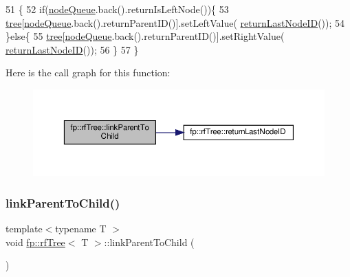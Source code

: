 \begin{DoxyCode}
51                                                \{
52                     \textcolor{keywordflow}{if}(\hyperlink{classfp_1_1rfTree_af72d0a2f930fd480dfb4858885c2df23}{nodeQueue}.back().returnIsLeftNode())\{
53                         \hyperlink{classtree}{tree}[\hyperlink{classfp_1_1rfTree_af72d0a2f930fd480dfb4858885c2df23}{nodeQueue}.back().returnParentID()].setLeftValue(
      \hyperlink{classfp_1_1rfTree_a1b8c04f3f3ce362d9627c2ca66d10efd}{returnLastNodeID}());
54                     \}\textcolor{keywordflow}{else}\{
55                         \hyperlink{classtree}{tree}[\hyperlink{classfp_1_1rfTree_af72d0a2f930fd480dfb4858885c2df23}{nodeQueue}.back().returnParentID()].setRightValue(
      \hyperlink{classfp_1_1rfTree_a1b8c04f3f3ce362d9627c2ca66d10efd}{returnLastNodeID}());
56                     \}
57                 \}
\end{DoxyCode}
Here is the call graph for this function\+:
\nopagebreak
\begin{figure}[H]
\begin{center}
\leavevmode
\includegraphics[width=350pt]{classfp_1_1rfTree_aceaedc5d54bb429c1a3539f164a93d45_cgraph}
\end{center}
\end{figure}
\mbox{\label{classfp_1_1rfTree_aceaedc5d54bb429c1a3539f164a93d45}} 
\subsubsection{\texorpdfstring{link\+Parent\+To\+Child()}{linkParentToChild()}\hspace{0.1cm}{\footnotesize\ttfamily [2/2]}}
{\footnotesize\ttfamily template$<$typename T $>$ \\
void \hyperlink{classfp_1_1rfTree}{fp\+::rf\+Tree}$<$ T $>$\+::link\+Parent\+To\+Child (\begin{DoxyParamCaption}{ }\end{DoxyParamCaption})\hspace{0.3cm}{\ttfamily [inline]}}



